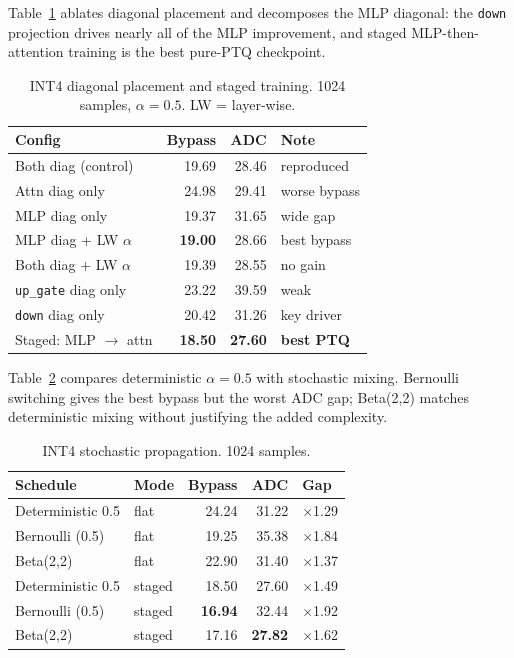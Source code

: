 \documentclass[letterpaper]{article} %
\theoremstyle{plain}
\begin{document}
Table~\ref{tab:int4v3v4} ablates diagonal placement and decomposes the MLP diagonal: the \texttt{down} projection drives nearly all of the MLP improvement, and staged MLP-then-attention training is the best pure-PTQ checkpoint.

\begin{table}[htbp]
\centering
\begin{tabular}{@{}lrrl@{}}
\toprule
\textbf{Config} & \textbf{Bypass} & \textbf{ADC} & \textbf{Note} \\
\midrule
Both diag (control)        & 19.69 & 28.46 & reproduced \\
Attn diag only             & 24.98 & 29.41 & worse bypass \\
MLP diag only              & 19.37 & 31.65 & wide gap \\
MLP diag + LW $\alpha$     & \textbf{19.00} & 28.66 & best bypass \\
Both diag + LW $\alpha$    & 19.39 & 28.55 & no gain \\
\midrule
\texttt{up\_gate} diag only & 23.22 & 39.59 & weak \\
\texttt{down} diag only     & 20.42 & 31.26 & key driver \\
Staged: MLP $\to$ attn      & \textbf{18.50} & \textbf{27.60} & \textbf{best PTQ} \\
\bottomrule
\end{tabular}
\caption{INT4 diagonal placement and staged training. 1024 samples, $\alpha=0.5$. LW = layer-wise.}
\label{tab:int4v3v4}
\end{table}

Table~\ref{tab:int4v5} compares deterministic $\alpha=0.5$ with stochastic mixing. Bernoulli switching gives the best bypass but the worst ADC gap; Beta(2,2) matches deterministic mixing without justifying the added complexity.

\begin{table}[htbp]
\centering
\begin{tabular}{@{}llrrl@{}}
\toprule
\textbf{Schedule} & \textbf{Mode} & \textbf{Bypass} & \textbf{ADC} & \textbf{Gap} \\
\midrule
Deterministic 0.5 & flat   & 24.24 & 31.22 & $\times$1.29 \\
Bernoulli (0.5)   & flat   & 19.25 & 35.38 & $\times$1.84 \\
Beta(2,2)         & flat   & 22.90 & 31.40 & $\times$1.37 \\
Deterministic 0.5 & staged & 18.50 & 27.60 & $\times$1.49 \\
Bernoulli (0.5)   & staged & \textbf{16.94} & 32.44 & $\times$1.92 \\
Beta(2,2)         & staged & 17.16 & \textbf{27.82} & $\times$1.62 \\
\bottomrule
\end{tabular}
\caption{INT4 stochastic propagation. 1024 samples.}
\label{tab:int4v5}
\end{table}
\end{document}
